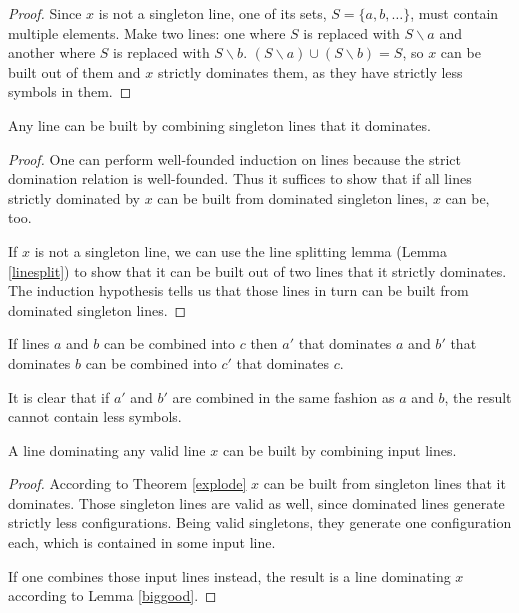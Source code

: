 \documentclass[english, 12pt, a4paper, sci, a-1b, online]{aaltothesis}
\begin{document}
\begin{proof}
Since $x$ is not a singleton line, one of its sets, $S = \{a, b, \dots\}$, must contain multiple elements. Make two lines: one where $S$ is replaced with $S \smallsetminus a$ and another where $S$ is replaced with $S \smallsetminus b$. $(S \smallsetminus a) \cup (S \smallsetminus b) = S$, so $x$ can be built out of them and $x$ strictly dominates them, as they have strictly less symbols in them.
\end{proof}

\begin{theorem}
\label{explode}
Any line can be built by combining singleton lines that it dominates.
\end{theorem}

\begin{proof}
One can perform well-founded induction on lines because the strict domination relation is well-founded. Thus it suffices to show that if all lines strictly dominated by $x$ can be built from dominated singleton lines, $x$ can be, too.

If $x$ is not a singleton line, we can use the line splitting lemma (Lemma \ref{linesplit}) to show that it can be built out of two lines that it strictly dominates. The induction hypothesis tells us that those lines in turn can be built from dominated singleton lines.
\end{proof}

\begin{lemma}
\label{biggood}
If lines $a$ and $b$ can be combined into $c$ then $a'$ that dominates $a$ and $b'$ that dominates $b$ can be combined into $c'$ that dominates $c$.
\end{lemma}

It is clear that if $a'$ and $b'$ are combined in the same fashion as $a$ and $b$, the result cannot contain less symbols.

\begin{theorem}
\label{complete}
A line dominating any valid line $x$ can be built by combining input lines.
\end{theorem}

\begin{proof}
According to Theorem \ref{explode} $x$ can be built from singleton lines that it dominates. Those singleton lines are valid as well, since dominated lines generate strictly less configurations. Being valid singletons, they generate one configuration each, which is contained in some input line.

If one combines those input lines instead, the result is a line dominating $x$ according to Lemma \ref{biggood}.
\end{proof}
\end{document}
